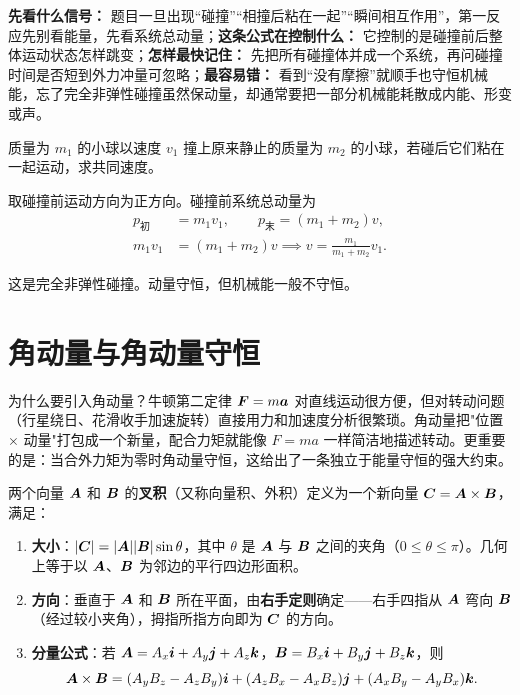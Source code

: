 \documentclass[lang=cn,11pt]{elegantbook}
\newcommand{\bridge}[1]{\begin{note}#1\end{note}}
\begin{document}
\begin{note}
\textbf{先看什么信号：} 题目一旦出现“碰撞”“相撞后粘在一起”“瞬间相互作用”，第一反应先别看能量，先看系统总动量；\textbf{这条公式在控制什么：} 它控制的是碰撞前后整体运动状态怎样跳变；\textbf{怎样最快记住：} 先把所有碰撞体并成一个系统，再问碰撞时间是否短到外力冲量可忽略；\textbf{最容易错：} 看到“没有摩擦”就顺手也守恒机械能，忘了完全非弹性碰撞虽然保动量，却通常要把一部分机械能耗散成内能、形变或声。
\end{note}

\begin{example}
质量为 \(m_1\) 的小球以速度 \(v_1\) 撞上原来静止的质量为 \(m_2\) 的小球，若碰后它们粘在一起运动，求共同速度。
\end{example}

\begin{solution}
取碰撞前运动方向为正方向。碰撞前系统总动量为
\[
\begin{aligned}
p_{\text{初}}&=m_1v_1,\qquad
p_{\text{末}}=(m_1+m_2)v,\\
m_1v_1&=(m_1+m_2)v
\implies
v=\frac{m_1}{m_1+m_2}v_1.
\end{aligned}
\]

这是完全非弹性碰撞。动量守恒，但机械能一般不守恒。
\end{solution}

\section{角动量与角动量守恒}

\bridge{为什么要引入角动量？牛顿第二定律 \(\vb*{F}=m\vb*{a}\) 对直线运动很方便，但对转动问题（行星绕日、花滑收手加速旋转）直接用力和加速度分析很繁琐。角动量把"位置 \(\times\) 动量"打包成一个新量，配合力矩就能像 \(F=ma\) 一样简洁地描述转动。更重要的是：当合外力矩为零时角动量守恒，这给出了一条独立于能量守恒的强大约束。}

\begin{definition}[叉积（向量积）]\label{def:cross-product}
两个向量 \(\vb*{A}\) 和 \(\vb*{B}\) 的\textbf{叉积}（又称向量积、外积）定义为一个新向量 \(\vb*{C}=\vb*{A}\times\vb*{B}\)，满足：
\begin{enumerate}
\item \textbf{大小}：\(|\vb*{C}|=|\vb*{A}||\vb*{B}|\sin\theta\)，其中 \(\theta\) 是 \(\vb*{A}\) 与 \(\vb*{B}\) 之间的夹角（\(0\leq\theta\leq\pi\)）。几何上等于以 \(\vb*{A}\)、\(\vb*{B}\) 为邻边的平行四边形面积。
\item \textbf{方向}：垂直于 \(\vb*{A}\) 和 \(\vb*{B}\) 所在平面，由\textbf{右手定则}确定——右手四指从 \(\vb*{A}\) 弯向 \(\vb*{B}\)（经过较小夹角），拇指所指方向即为 \(\vb*{C}\) 的方向。
\item \textbf{分量公式}：若 \(\vb*{A}=A_x\vb*{i}+A_y\vb*{j}+A_z\vb*{k}\)，\(\vb*{B}=B_x\vb*{i}+B_y\vb*{j}+B_z\vb*{k}\)，则
\[
\vb*{A}\times\vb*{B}=(A_yB_z-A_zB_y)\vb*{i}+(A_zB_x-A_xB_z)\vb*{j}+(A_xB_y-A_yB_x)\vb*{k}.
\]
\end{enumerate}
\end{definition}
\end{document}
